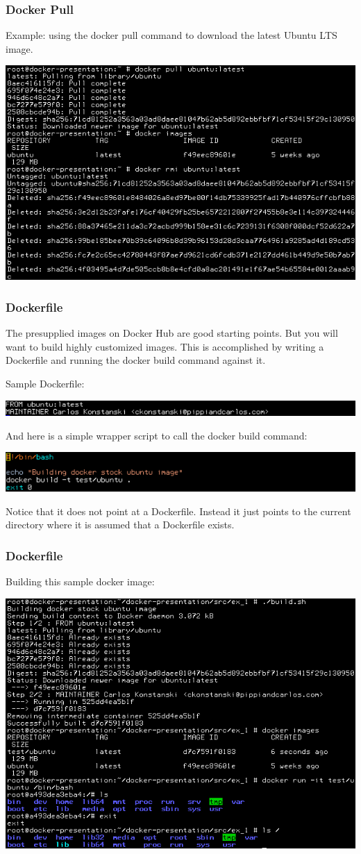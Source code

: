 \documentclass[helvetica,english,utf8,notitle,nologo]{beamer}
\begin{document}
\begin{frame}
  \frametitle{Docker Pull}

  Example: using the docker pull command to download the latest Ubuntu
  LTS image.

  \includegraphics[scale=0.48]{image_1}
\end{frame}

\begin{frame}
  \frametitle{Dockerfile}

  The presupplied images on Docker Hub are good starting points. But
  you will want to build highly customized images. This is
  accomplished by writing a Dockerfile and running the docker build
  command against it.

  Sample Dockerfile:

  \includegraphics[scale=0.48]{image_3}

  And here is a simple wrapper script to call the docker build command:

  \includegraphics[scale=0.48]{image_4}

  Notice that it does not point at a Dockerfile. Instead it just
  points to the current directory where it is assumed that a
  Dockerfile exists.
\end{frame}

\begin{frame}
  \frametitle{Dockerfile}

  Building this sample docker image:

  \includegraphics[scale=0.48]{image_2}
\end{frame}
\end{document}
